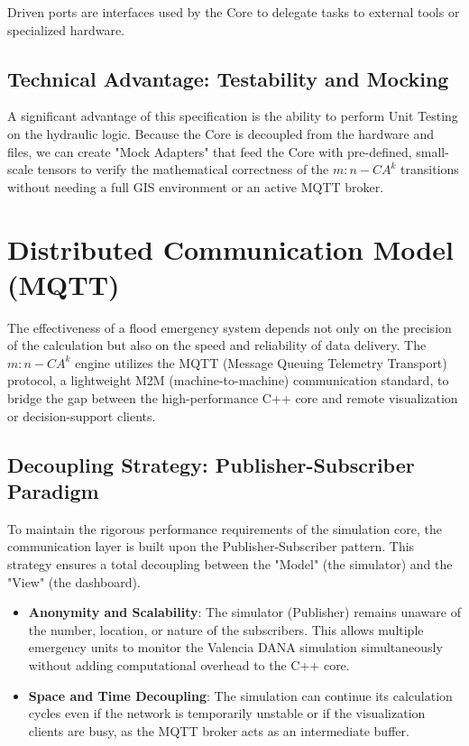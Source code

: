 Driven ports are interfaces used by the Core to delegate tasks to external tools or specialized hardware.


\subsection{Technical Advantage: Testability and Mocking}

A significant advantage of this specification is the ability to perform Unit Testing on the hydraulic logic. Because the Core is 
decoupled from the hardware and files, we can create "Mock Adapters" that feed the Core with pre-defined, small-scale tensors to 
verify the mathematical correctness of the $m:n-CA^k$ transitions without needing a full GIS environment or an active MQTT broker.


\section{Distributed Communication Model (MQTT)}

The effectiveness of a flood emergency system depends not only on the precision of the calculation but also on the speed and reliability 
of data delivery. The $m:n-CA^k$ engine utilizes the MQTT (Message Queuing Telemetry Transport) protocol, a lightweight M2M 
(machine-to-machine) communication standard, to bridge the gap between the high-performance C++ core and remote visualization or 
decision-support clients.


\subsection{Decoupling Strategy: Publisher-Subscriber Paradigm}

To maintain the rigorous performance requirements of the simulation core, the communication layer is built upon the Publisher-Subscriber 
pattern. This strategy ensures a total decoupling between the "Model" (the simulator) and the "View" (the dashboard).

\begin{itemize}
    \item \textbf{Anonymity and Scalability}: The simulator (Publisher) remains unaware of the number, location, or nature of the subscribers. This allows multiple emergency units to monitor the Valencia DANA simulation simultaneously without adding computational overhead to the C++ core.

    \item \textbf{Space and Time Decoupling}: The simulation can continue its calculation cycles even if the network is temporarily unstable or if the visualization clients are busy, as the MQTT broker acts as an intermediate buffer.
\end{itemize}


